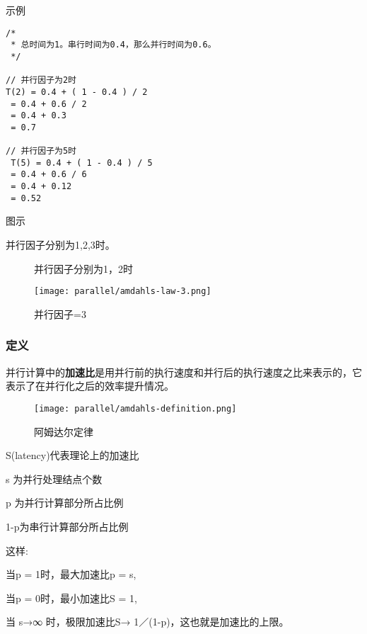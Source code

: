 

示例

\begin{lstlisting}
/*
 * 总时间为1。串行时间为0.4，那么并行时间为0.6。
 */

// 并行因子为2时
T(2) = 0.4 + ( 1 - 0.4 ) / 2
 = 0.4 + 0.6 / 2
 = 0.4 + 0.3
 = 0.7

// 并行因子为5时
 T(5) = 0.4 + ( 1 - 0.4 ) / 5
 = 0.4 + 0.6 / 6
 = 0.4 + 0.12
 = 0.52
\end{lstlisting}

图示

并行因子分别为1,2,3时。

\begin{figure}[H]
    \centering
        \caption{并行因子分别为1，2时}
\end{figure}

\begin{figure}[H]
    \centering
    \label{P3}
    \texttt{[image: parallel/amdahls-law-3.png]}
    \caption{并行因子=3}
\end{figure}


\subsubsection{定义} 

并行计算中的\textbf{加速比}是用并行前的执行速度和并行后的执行速度之比来表示的，它表示了在并行化之后的效率提升情况。


 \begin{figure}[H]
    \centering
    \texttt{[image: parallel/amdahls-definition.png]}
    \caption{阿姆达尔定律}
\end{figure}

S(latency)代表理论上的加速比

s 为并行处理结点个数

p 为并行计算部分所占比例

1-p为串行计算部分所占比例

这样:

当p = 1时，最大加速比p = s,

当p = 0时，最小加速比S = 1,

当 s→∞ 时，极限加速比S→ 1／(1-p)，这也就是加速比的上限。

